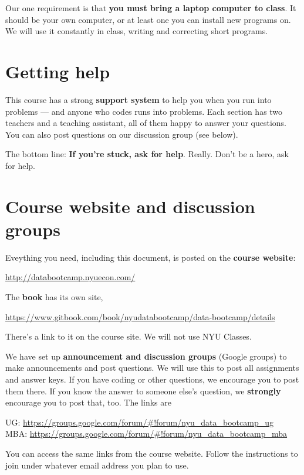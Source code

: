 \documentclass[11pt]{article}
\begin{document}
Our one requirement is that {\bf you must bring a laptop computer to class\/}.
It should be your own computer, or at least one you can install new programs on.
We will use it constantly in class, writing and correcting short programs.


\section*{Getting help}



This course has a strong {\bf support system\/} to help you when you run into problems ---
and anyone who codes runs into problems.
Each section has two teachers and a teaching assistant, all of them happy to answer your questions.
You  can also post questions on our discussion group (see below).

The bottom line:  {\bf If you're stuck, ask for help\/}.
Really.  Don't be a hero, ask for help.



\section*{Course website and discussion groups}

Eveything you need, including this document, is posted on
the {\bf course website\/}:
%
\vspace{-0.15in}
\begin{center}
\url{http://databootcamp.nyuecon.com/}
\end{center}
\vspace{-0.15in}
%
The {\bf book\/} has its own site,
\vspace{-0.15in}
\begin{center}
\url{https://www.gitbook.com/book/nyudatabootcamp/data-bootcamp/details}
\end{center}
\vspace{-0.15in}
%
There's a link to it on the course site.
We will not use NYU Classes.

We have set up {\bf announcement and discussion groups\/} (Google groups)
to make announcements and post questions. We will use this to post all assignments and
answer keys.
If you have coding or other questions, we encourage you to post them there.
If you know the answer to someone else's question, we {\bf strongly } encourage you to post that, too.
The links are
\vspace{-0.1in}
\begin{center}
UG:   \url{https://groups.google.com/forum/#!forum/nyu_data_bootcamp_ug}  \\
MBA:  \url{https://groups.google.com/forum/#!forum/nyu_data_bootcamp_mba}
\end{center}
\vspace{-0.1in}
%
You can access the same links from the course website.  Follow the instructions to join under whatever email address you plan to use.
\end{document}
